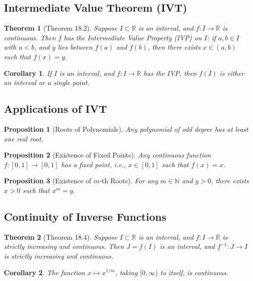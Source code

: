 \documentclass[9pt]{article}
\theoremstyle{definition}
\theoremstyle{plain}
\newtheorem{theorem}{Theorem}
\newtheorem{proposition}{Proposition}
\newtheorem{corollary}{Corollary}
\begin{document}
\subsection*{Intermediate Value Theorem (IVT)}
\begin{theorem}[Theorem 18.2]
Suppose \( I \subset \mathbb{R} \) is an interval, and \( f : I \to \mathbb{R} \) is continuous. Then \( f \) has the Intermediate Value Property (IVP) on \( I \): if \( a, b \in I \) with \( a < b \), and \( y \) lies between \( f(a) \) and \( f(b) \), then there exists \( x \in (a, b) \) such that \( f(x) = y \).
\end{theorem}

\begin{corollary}
If \( I \) is an interval, and \( f : I \to \mathbb{R} \) has the IVP, then \( f(I) \) is either an interval or a single point.
\end{corollary}

\subsection*{Applications of IVT}
\begin{proposition}[Roots of Polynomials]
Any polynomial of odd degree has at least one real root.
\end{proposition}

\begin{proposition}[Existence of Fixed Points]
Any continuous function \( f : [0, 1] \to [0, 1] \) has a fixed point, i.e., \( x \in [0, 1] \) such that \( f(x) = x \).
\end{proposition}

\begin{proposition}[Existence of \( m \)-th Roots]
For any \( m \in \mathbb{N} \) and \( y > 0 \), there exists \( x > 0 \) such that \( x^m = y \).
\end{proposition}

\subsection*{Continuity of Inverse Functions}
\begin{theorem}[Theorem 18.4]
Suppose \( I \subset \mathbb{R} \) is an interval, and \( f : I \to \mathbb{R} \) is strictly increasing and continuous. Then \( J = f(I) \) is an interval, and \( f^{-1} : J \to I \) is strictly increasing and continuous.
\end{theorem}

\begin{corollary}
The function \( x \mapsto x^{1/m} \), taking \( [0, \infty) \) to itself, is continuous.
\end{corollary}
\end{document}
